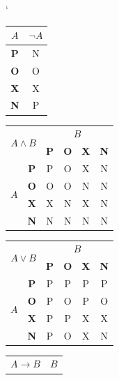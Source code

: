 \documentclass[a4paper, 11pt]{article}
\begin{document}
\begin{table}[ht]
    \catcode` %
    \centering
    \begin{tabular}{|c|c|}
        \hline
        $A$ & $\neg A$ \\
        \hline
        \textbf{P} & N \\
        \hline
        \textbf{O} & O \\
        \hline
        \textbf{X} & X \\
        \hline
        \textbf{N} & P \\
        \hline
    \end{tabular}
    \begin{tabular}{|c|c|c|c|c|c|}
        \hline
        \multicolumn{2}{|c|}{\multirow{2}{*}{$A\land B$}} & \multicolumn{4}{c|}{$B$} \\
        \cline{3-6}
        \multicolumn{2}{|c|}{} & \textbf{P} & \textbf{O} & \textbf{X} & \textbf{N} \\
        \hline
        \multirow{4}{*}{$A$} & \textbf{P} & P & O & X & N \\
        \cline{2-6}
        & \textbf{O} & O & O & N & N \\
        \cline{2-6}
        & \textbf{X} & X & N & X & N \\
        \cline{2-6}
        & \textbf{N} & N & N & N & N \\
        \hline
    \end{tabular}
    \begin{tabular}{|c|c|c|c|c|c|}
        \hline
        \multicolumn{2}{|c|}{\multirow{2}{*}{$A\lor B$}} & \multicolumn{4}{c|}{$B$} \\
        \cline{3-6}
        \multicolumn{2}{|c|}{} & \textbf{P} & \textbf{O} & \textbf{X} & \textbf{N} \\
        \hline
        \multirow{4}{*}{$A$} & \textbf{P} & P & P & P & P \\
        \cline{2-6}
        & \textbf{O} & P & O & P & O \\
        \cline{2-6}
        & \textbf{X} & P & P & X & X \\
        \cline{2-6}
        & \textbf{N} & P & O & X & N \\
        \hline
    \end{tabular}
    \begin{tabular}{|c|c|c|c|c|c|}
        \hline
        \multicolumn{2}{|c|}{\multirow{2}{*}{$A\rightarrow B$}} & \multicolumn{4}{c|}{$B$} \\
        \cline{3-6}

\end{tabular}
\end{table}
\end{document}
